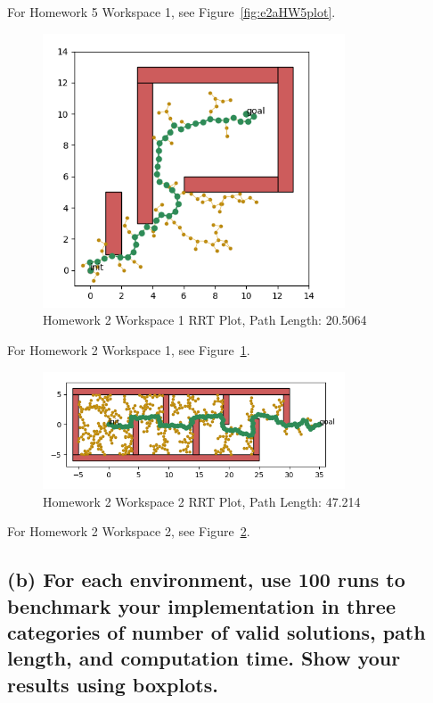 \documentclass{article}
\begin{document}
For Homework 5 Workspace 1, see Figure~\ref{fig:e2aHW5plot}.

\begin{figure}[h]
    \centering
    \includegraphics[width=0.8\textwidth]{e2aHW2W1plot.png}
    \caption{Homework 2 Workspace 1 RRT Plot, Path Length: 20.5064}
    \label{fig:e2aHW2W1plot}
\end{figure}

For Homework 2 Workspace 1, see Figure~\ref{fig:e2aHW2W1plot}.

\begin{figure}[h]
    \centering
    \includegraphics[width=0.8\textwidth]{e2aHW2W2plot.png}
    \caption{Homework 2 Workspace 2 RRT Plot, Path Length: 47.214}
    \label{fig:e2aHW2W2plot}
\end{figure}

For Homework 2 Workspace 2, see Figure~\ref{fig:e2aHW2W2plot}.

\subsection*{(b)
For each environment, use 100 runs to benchmark your implementation in three categories of number of valid solutions, path length, and computation time. Show your results using boxplots.
}
\end{document}
